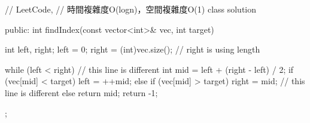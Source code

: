 \begin{Code}
// LeetCode, 
// 時間複雜度O(logn)，空間複雜度O(1)
class solution{
public:
    int findIndex(const vector<int>& vec, int target) {
        int left, right;
        left = 0; right = (int)vec.size(); // right is using length 
        
        while (left < right) { // this line is different
            int mid = left + (right - left) / 2;
            if (vec[mid] < target)
                left = ++mid;
            else if (vec[mid] > target)
                right = mid; // this line is different
            else
                return mid;
        }
        return -1;
    }
};
\end{Code}
